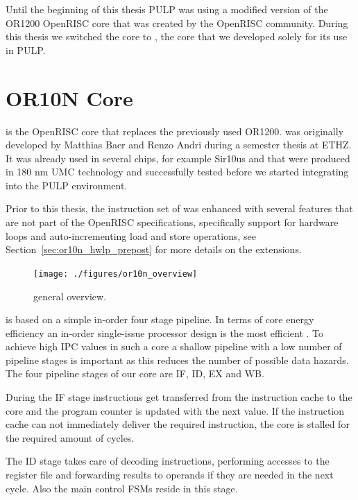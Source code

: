 Until the beginning of this thesis \gls{PULP} was using a modified version of
the OR1200 OpenRISC core \cite{OR1200} that was created by the OpenRISC
community. During this thesis we switched the core to \orion, the core that we
developed solely for its use in \gls{PULP}.


\section{OR10N Core}

\orion is the OpenRISC core that replaces the previously used OR1200. \orion was
originally developed by Matthias Baer and Renzo Andri during a semester thesis
at ETHZ. It was already used in several chips, for example Sir10us
\cite{Sir10us} and \orion that were produced in 180 nm UMC technology and
successfully tested before we started integrating \orion into the \gls{PULP}
environment.

Prior to this thesis, the instruction set of \orion was enhanced with several
features that are not part of the OpenRISC specifications, specifically support
for hardware loops and auto-incrementing load and store operations, see
Section~\ref{sec:or10n_hwlp_prepost} for more details on the extensions.


\begin{figure}[htbp]
  \centering \texttt{[image: ./figures/or10n\_overview]}
  \caption{\orion general overview.}
  \label{fig:or10n_overview}
\end{figure}


\orion is based on a simple in-order four stage pipeline. In terms of core
energy efficiency an in-order single-issue processor design is the most
efficient \cite{azizi2010}. To achieve high \gls{IPC} values in such a core a
shallow pipeline with a low number of pipeline stages is important as this
reduces the number of possible data hazards.
The four pipeline stages of our \orion core are \gls{IF}, \gls{ID}, \gls{EX}
and \gls{WB}.

During the IF stage instructions get transferred from the instruction cache to
the core and the program counter is updated with the next value. If the
instruction cache can not immediately deliver the required instruction, the core
is stalled for the required amount of cycles.

The ID stage takes care of decoding instructions, performing accesses to the
register file and forwarding results to operands if they are needed in the next
cycle. Also the main control \glspl{FSM} reside in this stage.

